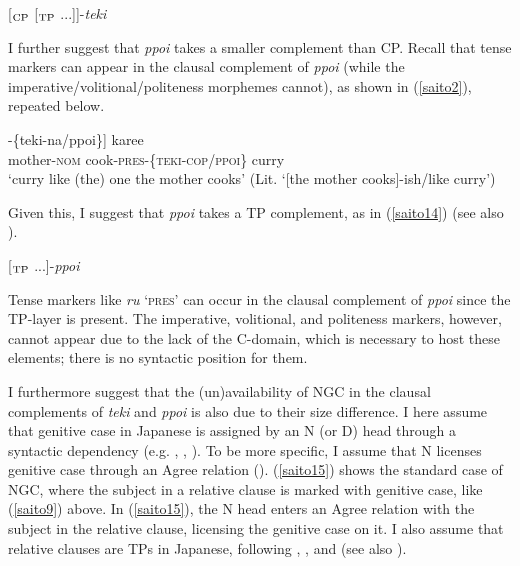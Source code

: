 \documentclass[output=paper]{langscibook}
\begin{document}
\begin{exe}
\ex \label{saito12}
[$_{\textnormal{CP}}$ [$_{\textnormal{TP}}$ ...]\hspace{0.5mm}]-\emph{teki}
\end{exe}

I further suggest that \emph{ppoi} takes a smaller complement than CP. Recall that tense markers can appear in the clausal complement of \emph{ppoi} (while the imperative/volitional/politeness morphemes cannot), as shown in (\ref{saito2}), repeated below. 

\begin{exe}
\ex \label{saito13}
\gll [[$_{\textnormal{S}}$ {okaasan-ga}   {tuku-ru}]-\{{teki-na/ppoi}\}] {karee}\\
{} mother-\textsc{nom} cook-\textsc{pres}-\{\textsc{teki-cop/ppoi}\} curry\\ 
\glt ‘curry like (the) one the mother cooks’ (Lit. ‘[the mother cooks]-ish/like curry’)
\end{exe}

Given this, I suggest that \textit{ppoi} takes a TP complement, as in (\ref{saito14}) (see also \citealt{Yamada2014}).

\begin{exe}
\ex \label{saito14}
[$_{\textnormal{TP}}$ ...]-\emph{ppoi}
\end{exe}

Tense markers like \emph{ru} ‘\textsc{pres}’ can occur in the clausal complement of \emph{ppoi} since  the TP-layer is present. The imperative, volitional, and politeness markers, however, cannot appear due to the lack of the C-domain, which is necessary to host these elements; there is no syntactic position for them.

I furthermore suggest that the (un)availability of NGC in the clausal complements of \emph{teki} and \emph{ppoi} is also due to their size difference. I here assume that genitive case in Japanese is assigned by an N (or D) head through a syntactic dependency (e.g. \citealt{Bedell1972}, \citealt{miyagawa1993}, \citealt{miyagawa2011}). To be more specific, I assume that N licenses genitive case through an Agree relation (\citealt{miyagawa2011}). (\ref{saito15}) shows the standard case of NGC, where the subject in a relative clause is marked with genitive case, like (\ref{saito9}) above. In (\ref{saito15}), the N head enters an Agree relation with the subject in the relative clause, licensing the genitive case on it. I also assume that relative clauses are TPs in Japanese, following \citet{murasugi1991}, \citet{Taguchi2008}, and \citet{ParkYoo2017} (see also \citealt{Saito1985}).
\end{document}
